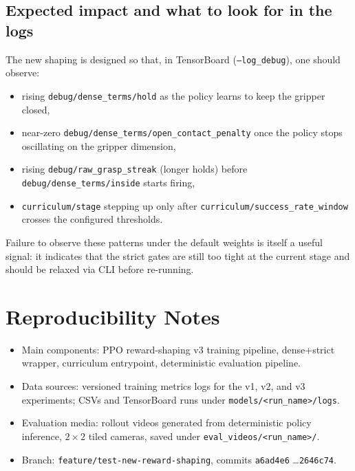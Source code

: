 \documentclass[11pt]{article}
\begin{document}
\subsection{Expected impact and what to look for in the logs}
The new shaping is designed so that, in TensorBoard
(\texttt{--log\_debug}), one should observe:
\begin{itemize}
  \item rising \texttt{debug/dense\_terms/hold} as the policy learns to keep
    the gripper closed,
  \item near-zero \texttt{debug/dense\_terms/open\_contact\_penalty} once
    the policy stops oscillating on the gripper dimension,
  \item rising \texttt{debug/raw\_grasp\_streak} (longer holds) before
    \texttt{debug/dense\_terms/inside} starts firing,
  \item \texttt{curriculum/stage} stepping up only after
    \texttt{curriculum/success\_rate\_window} crosses the configured
    thresholds.
\end{itemize}
Failure to observe these patterns under the default weights is itself a
useful signal: it indicates that the strict gates are still too tight at the
current stage and should be relaxed via CLI before re-running.

\section*{Reproducibility Notes}
\begin{itemize}
  \item Main components: PPO reward-shaping v3 training pipeline, dense+strict
    wrapper, curriculum entrypoint, deterministic evaluation pipeline.
  \item Data sources: versioned training metrics logs for the v1, v2, and v3
    experiments; CSVs and TensorBoard runs under \texttt{models/<run\_name>/logs}.
  \item Evaluation media: rollout videos generated from deterministic policy
    inference, $2 \times 2$ tiled cameras, saved under
    \texttt{eval\_videos/<run\_name>/}.
  \item Branch: \texttt{feature/test-new-reward-shaping}, commits
    \texttt{a6ad4e6} \dots \texttt{2646c74}.
\end{itemize}
\end{document}
